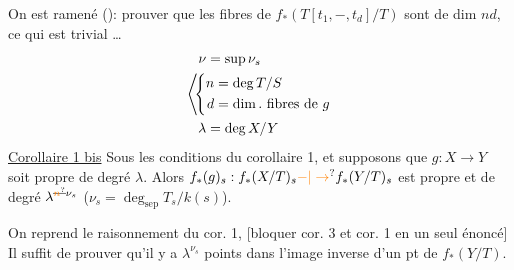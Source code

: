 On est ramené (): prouver que les fibres de
$f_\ast(T[t_1,\mathbin{-},t_d]/T)$ sont de dim $nd$,
ce qui est trivial \ldots
\[
\left\langle\begin{aligned}
\nu&=\sup\nu_s\\
&\hspace{-1em}\left\{\begin{aligned}n&=\deg T/S\\d&=\dim.\ \text{fibres de }g\end{aligned}\right.\\
\lambda&=\deg X/Y
\end{aligned}\right.
\]
\uline{Corollaire 1 bis} Sous les conditions du corollaire 1,
  et supposons que
  $g:X\to Y$ soit propre de degré  $\lambda$.
Alors $f_\ast(g)_s:f_\ast(X/T)_s\unsure{\mathbin{-}|\to}f_\ast(Y/T)_s$ est
propre et de degré $\lambda^{\deleted{\unsure{n}}\nu_s}$ ($\nu_s=\deg_{\mathrm{sep}}T_s/k(s)$).

On reprend le raisonnement du cor. 1,
[bloquer cor. 3 et cor. 1 en un
seul énoncé] Il suffit de prouver
qu'il y a \uline{} $\lambda^{\nu_s}$ points dans
l'image inverse d'un pt de $f_\ast(Y/T)$.

